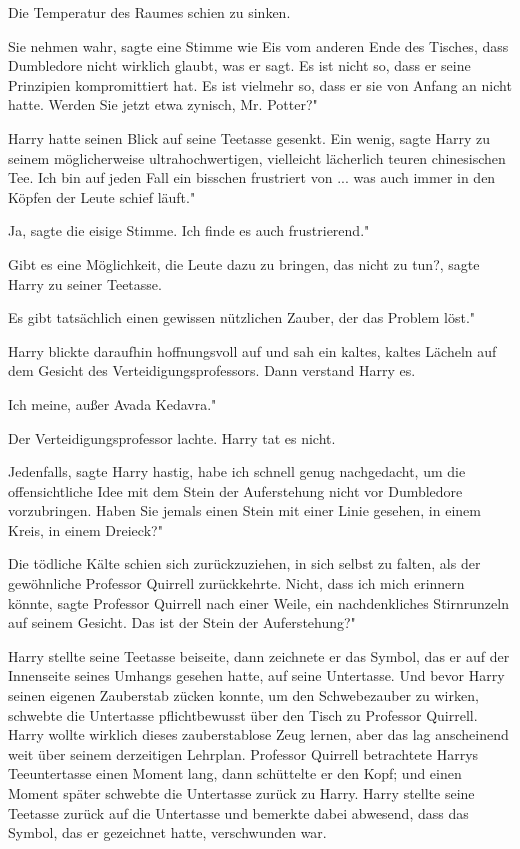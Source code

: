 Die Temperatur des Raumes schien zu sinken.

\glqq{}Sie nehmen wahr\grqq{}, sagte eine Stimme wie Eis vom anderen Ende des
Tisches, \glqq{}dass Dumbledore nicht wirklich glaubt, was er sagt. Es ist nicht
so, dass er seine Prinzipien kompromittiert hat. Es ist vielmehr so, dass er sie
von Anfang an nicht hatte. Werden Sie jetzt etwa zynisch, Mr. Potter?"

Harry hatte seinen Blick auf seine Teetasse gesenkt. \glqq{}Ein wenig\grqq{},
sagte Harry zu seinem möglicherweise ultrahochwertigen, vielleicht lächerlich
teuren chinesischen Tee. \glqq{}Ich bin auf jeden Fall ein bisschen frustriert
von ... was auch immer in den Köpfen der Leute schief läuft."

\glqq{}Ja\grqq{}, sagte die eisige Stimme. \glqq{}Ich finde es auch frustrierend."

\glqq{}Gibt es eine Möglichkeit, die Leute dazu zu bringen, das nicht zu
tun?\grqq{}, sagte Harry zu seiner Teetasse.

\glqq{}Es gibt tatsächlich einen gewissen nützlichen Zauber, der das Problem
löst."

Harry blickte daraufhin hoffnungsvoll auf und sah ein kaltes, kaltes Lächeln auf
dem Gesicht des Verteidigungsprofessors. Dann verstand Harry es.

\glqq{}Ich meine, außer Avada Kedavra."

Der Verteidigungsprofessor lachte. Harry tat es nicht.

\glqq{}Jedenfalls\grqq{}, sagte Harry hastig, \glqq{}habe ich schnell genug
nachgedacht, um die offensichtliche Idee mit dem Stein der Auferstehung nicht
vor Dumbledore vorzubringen. Haben Sie jemals einen Stein mit einer Linie
gesehen, in einem Kreis, in einem Dreieck?"

Die tödliche Kälte schien sich zurückzuziehen, in sich selbst zu falten, als der
gewöhnliche Professor Quirrell zurückkehrte. \glqq{}Nicht, dass ich mich erinnern
könnte\grqq{}, sagte Professor Quirrell nach einer Weile, ein nachdenkliches
Stirnrunzeln auf seinem Gesicht. \glqq{}Das ist der Stein der Auferstehung?"

Harry stellte seine Teetasse beiseite, dann zeichnete er das Symbol, das er auf
der Innenseite seines Umhangs gesehen hatte, auf seine Untertasse. Und bevor
Harry seinen eigenen Zauberstab zücken konnte, um den Schwebezauber zu wirken,
schwebte die Untertasse pflichtbewusst über den Tisch zu Professor Quirrell.
Harry wollte wirklich dieses zauberstablose Zeug lernen, aber das lag
anscheinend weit über seinem derzeitigen Lehrplan. Professor Quirrell
betrachtete Harrys Teeuntertasse einen Moment lang, dann schüttelte er den Kopf;
und einen Moment später schwebte die Untertasse zurück zu Harry. Harry stellte
seine Teetasse zurück auf die Untertasse und bemerkte dabei abwesend, dass das
Symbol, das er gezeichnet hatte, verschwunden war.

